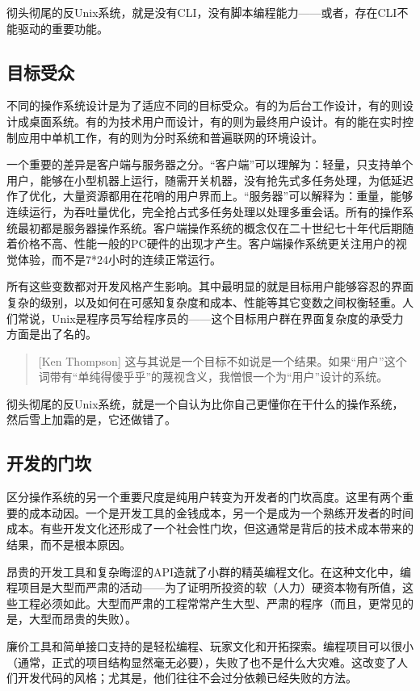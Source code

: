 \documentclass[12pt,oneside]{book}
\begin{document}
彻头彻尾的反Unix系统，就是没有CLI，没有脚本编程能力——或者，存在CLI不能驱动的重要功能。

\subsection{目标受众}
不同的操作系统设计是为了适应不同的目标受众。有的为后台工作设计，有的则设计成桌面系统。有的为技术用户而设计，有的则为最终用户设计。有的能在实时控制应用中单机工作，有的则为分时系统和普遍联网的环境设计。

一个重要的差异是客户端与服务器之分。“客户端”可以理解为：轻量，只支持单个用户，能够在小型机器上运行，随需开关机器，没有抢先式多任务处理，为低延迟作了优化，大量资源都用在花哨的用户界而上。“服务器”可以解释为：重量，能够连续运行，为吞吐量优化，完全抢占式多任务处理以处理多重会话。所有的操作系统最初都是服务器操作系统。客户端操作系统的概念仅在二十世纪七十年代后期随着价格不高、性能一般的PC硬件的出现才产生。客户端操作系统更关注用户的视觉体验，而不是7*24小时的连续正常运行。

所有这些变数都对开发风格产生影响。其中最明显的就是目标用户能够容忍的界面复杂的级别，以及如何在可感知复杂度和成本、性能等其它变数之间权衡轻重。人们常说，Unix是程序员写给程序员的——这个目标用户群在界面复杂度的承受力方面是出了名的。

\begin{quote}[Ken Thompson]
这与其说是一个目标不如说是一个结果。如果“用户”这个词带有“单纯得傻乎乎”的蔑视含义，我憎恨一个为“用户”设计的系统。
\end{quote}

彻头彻尾的反Unix系统，就是一个自认为比你自己更懂你在干什么的操作系统，然后雪上加霜的是，它还做错了。

\subsection{开发的门坎}
区分操作系统的另一个重要尺度是纯用户转变为开发者的门坎高度。这里有两个重要的成本动因。一个是开发工具的金钱成本，另一个是成为一个熟练开发者的时间成本。有些开发文化还形成了一个社会性门坎，但这通常是背后的技术成本带来的结果，而不是根本原因。

昂贵的开发工具和复杂晦涩的API造就了小群的精英编程文化。在这种文化中，编程项目是大型而严肃的活动——为了证明所投资的软（人力）硬资本物有所值，这些工程必须如此。大型而严肃的工程常常产生大型、严肃的程序（而且，更常见的是，大型而昂贵的失败）。

廉价工具和简单接口支持的是轻松编程、玩家文化和开拓探索。编程项目可以很小（通常，正式的项目结构显然毫无必要），失败了也不是什么大灾难。这改变了人们开发代码的风格；尤其是，他们往往不会过分依赖已经失败的方法。
\end{document}
